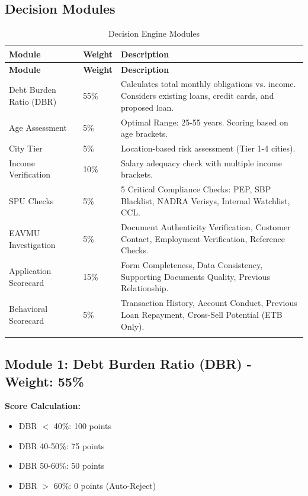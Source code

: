 \documentclass[12pt,a4paper]{article}
\begin{document}
\subsection{Decision Modules}

\begin{longtable}{@{}p{4cm}p{2cm}p{8cm}@{}}
\toprule
\textbf{Module} & \textbf{Weight} & \textbf{Description} \\ \midrule
\endfirsthead
\toprule
\textbf{Module} & \textbf{Weight} & \textbf{Description} \\ \midrule
\endhead
Debt Burden Ratio (DBR) & 55\% & Calculates total monthly obligations vs. income. Considers existing loans, credit cards, and proposed loan. \\
\midrule
Age Assessment & 5\% & Optimal Range: 25-55 years. Scoring based on age brackets. \\
\midrule
City Tier & 5\% & Location-based risk assessment (Tier 1-4 cities). \\
\midrule
Income Verification & 10\% & Salary adequacy check with multiple income brackets. \\
\midrule
SPU Checks & 5\% & 5 Critical Compliance Checks: PEP, SBP Blacklist, NADRA Verisys, Internal Watchlist, CCL. \\
\midrule
EAVMU Investigation & 5\% & Document Authenticity Verification, Customer Contact, Employment Verification, Reference Checks. \\
\midrule
Application Scorecard & 15\% & Form Completeness, Data Consistency, Supporting Documents Quality, Previous Relationship. \\
\midrule
Behavioral Scorecard & 5\% & Transaction History, Account Conduct, Previous Loan Repayment, Cross-Sell Potential (ETB Only). \\
\bottomrule
\caption{Decision Engine Modules}
\end{longtable}

\subsection{Module 1: Debt Burden Ratio (DBR) - Weight: 55\%}

\textbf{Score Calculation:}
\begin{itemize}
    \item DBR $<$ 40\%: 100 points
    \item DBR 40-50\%: 75 points
    \item DBR 50-60\%: 50 points
    \item DBR $>$ 60\%: 0 points (Auto-Reject)
\end{itemize}
\end{document}

